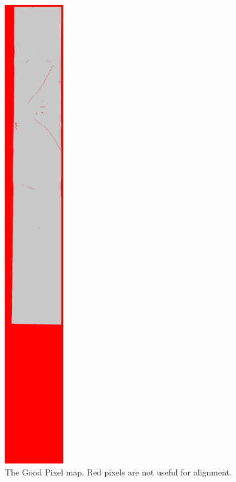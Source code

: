 \begin{figure}
\begin{center}
\includegraphics[height=8in]{images/p19-goodpixel.png}
\caption[P19 good pixel image]{
    \label{p19-goodpixel}
	The Good Pixel map. 
	Red pixels are not useful for alignment. 
    }
\end{center}
\end{figure}

